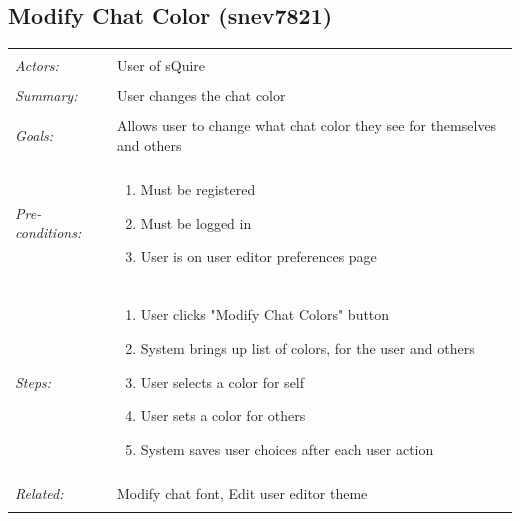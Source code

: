 \documentclass[11pt]{report}
\begin{document}
\subsection{Modify Chat Color (snev7821)}
\begin{tabular}{ p{2cm} p{12cm} }
\hline
\\
	\textit{Actors:} & User of sQuire \\
	\\
	\textit{Summary:} & User changes the chat color \\
	\\
	\textit{Goals:} & Allows user to change what chat color they see for themselves and others \\
	\\
	\textit{Pre-conditions:} & \begin{enumerate}
		\item Must be registered
		\item Must be logged in
		\item User is on user editor preferences page
	\end{enumerate} \\
	\\
	\textit{Steps:} & \begin{enumerate}
		\item User clicks "Modify Chat Colors" button
		\item System brings up list of colors, for the user and others
		\item User selects a color for self
		\item User sets a color for others
		\item System saves user choices after each user action
	\end{enumerate} \\
	\\
	\textit{Related:} & Modify chat font, Edit user editor theme\\
	\\
\hline
\end{tabular}
\newpage
\end{document}
